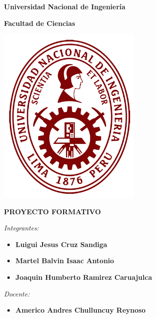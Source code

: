 \documentclass[12pt, a4paper]{article}
\begin{document}
	
	\begin{titlepage}
		\centering
		\textbf{\LARGE Universidad Nacional de Ingeniería}
		
		\vspace{1cm}
		
		\textbf{\LARGE Facultad de Ciencias}
		
		\vspace{2cm}
		
		\includegraphics[width=7cm]{images/uni_logo.png}
		
		\vspace{2cm}
		
		\textbf{\Huge PROYECTO FORMATIVO}
		
		\vspace{2cm}
		
		\textit{\Large Integrantes:}
		
		\begin{itemize}
			\item \textbf{Luigui Jesus Cruz Sandiga} 
			\item \textbf{Martel Balvin Isaac Antonio} 
			\item \textbf{Joaquin Humberto Ramirez Caruajulca}
		\end{itemize}
		
		\vspace{0.5cm}
		
		\textit{\Large Docente:}
		
		\begin{itemize}
			\item \textbf{Americo Andres Chulluncuy Reynoso}
		\end{itemize}
		
		\vspace{2cm}
		
		
	\end{titlepage}
	
\end{document}
